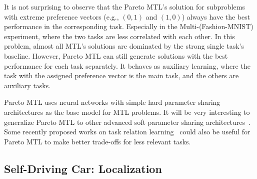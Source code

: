 It is not surprising to observe that the Pareto MTL's solution for subproblems with extreme preference vectors (e.g., $(0,1)$ and $(1,0)$) always have the best performance in the corresponding task. Especially in the Multi-(Fashion-MNIST) experiment, where the two tasks are less correlated with each other. In this problem, almost all MTL's solutions are dominated by the strong single task's baseline. However, Pareto MTL can still generate solutions with the best performance for each task separately. It behaves as auxiliary learning, where the task with the assigned preference vector is the main task, and the others are auxiliary tasks.

Pareto MTL uses neural networks with simple hard parameter sharing architectures as the base model for MTL problems. It will be very interesting to generalize Pareto MTL to other advanced soft parameter sharing architectures~\cite{ruder2017overview}. Some recently proposed works on task relation learning~\cite{zamir2018taskonomy,Ma2018Modeling,zhang2018learning} could also be useful for Pareto MTL to make better trade-offs for less relevant tasks.

\subsection{Self-Driving Car: Localization}

